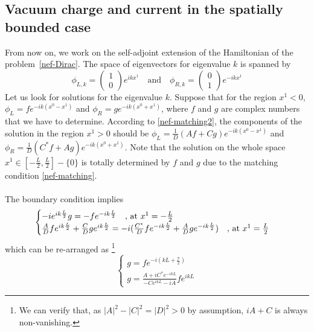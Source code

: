 \subsection{Vacuum charge and current in the spatially bounded case}
From now on, we work on the self-adjoint extension of the Hamiltonian of the problem~\cref{nef-Dirac}.
The space of eigenvectors for eigenvalue $k$ is spanned by
\begin{equation}\label{nef-basisSol}
\phi_{L,k} = 
\begin{pmatrix}
1 \\
0
\end{pmatrix} e^{ikx^1} \quad \textrm{and} \quad
\phi_{R,k} = 
\begin{pmatrix}
0 \\
1
\end{pmatrix} e^{-ikx^1}
\end{equation}
%
Let us look for solutions for the eigenvalue $k$.
Suppose that for the region $x^1<0$, 
 $\phi_L = f e^{-ik(x^0 - x^1)}$ and $\phi_R = g e^{-ik(x^0+x^1)}$, where $f$ and $g$ are complex numbers that we have to determine. 
According to \cref{nef-matching2}, the components of the solution in the region $x^1 > 0$ should be $\phi_L = \frac{1}{D} (Af+Cg) e^{-ik(x^0 - x^1)}$ and $\phi_R = \frac{1}{D}(C^* f + Ag ) e^{-ik(x^0 + x^1)}$. 
Note that the solution on the whole space $x^1 \in [-\frac{L}{2}, \frac{L}{2}] - \{0\}$ is totally determined by $f$ and $g$ due to the matching condition \cref{nef-matching}. \\\\
The boundary condition implies
\begin{equation}
\begin{cases}
-i e^{ik \frac{L}{2}} g = -f e^{-ik \frac{L}{2}}  \quad \textrm{, at $ x^1 = -\frac{L}{2}$}  \\
\frac{A}{D} f e^{ik \frac{L}{2}} + \frac{C}{D} g e^{ik \frac{L}{2}} = -i (\frac{C^*}{D} f e^{-ik \frac{L}{2}} + \frac{A}{D} g e^{-ik \frac{L}{2}})   \quad \textrm{, at $x^1 = \frac{L}{2}$}
\end{cases}
\end{equation}
which can be re-arranged as
\footnote{We can verify that, as $|A|^2 - |C|^2 = |D|^2 > 0$ by assumption, $iA + C$ is always non-vanishing.} 
\begin{equation}\label{nef-boundCond}
\begin{cases}
g = f e^{-i(kL+ \frac{\pi}{2})}  \\
g = \frac{A + iC^* e^{-ikL}}{- C e^{ikL} - iA} f e^{ikL}
\end{cases}
\end{equation}
